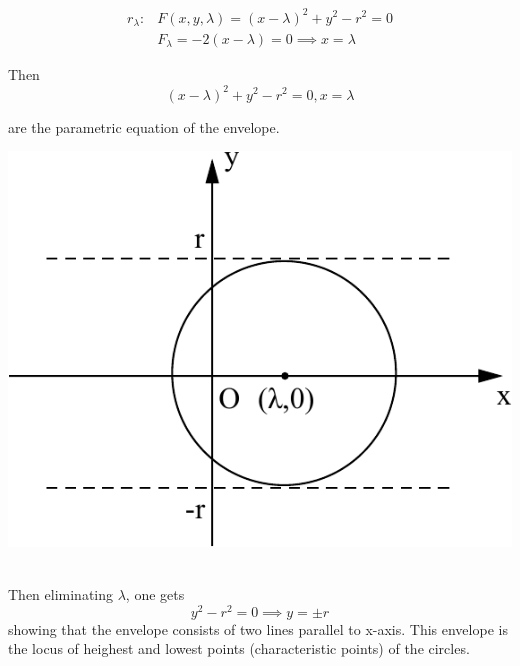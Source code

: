 \documentclass[11pt]{amsbook}
\begin{document}
\begin{hSolution}
	\begin{minipage}{0.6\textwidth}
		\begin{align*}
			r_\lambda : & F(x, y, \lambda) = (x - \lambda)^2 + y^2 - r^2 = 0    \\
			            & F_\lambda = -2 (x - \lambda) = 0 \implies x = \lambda
		\end{align*}

		Then
		\[
			(x - \lambda)^2 + y^2 - r^2 = 0, x = \lambda
		\]

		are the parametric equation of the envelope.
	\end{minipage}
	\begin{minipage}{0.4\textwidth}
		\includegraphics[width=1\textwidth, keepaspectratio]{images/b2p2-318-fig01}
	\end{minipage}\\

	Then eliminating $\lambda$, one gets
	\[
		y^2 - r^2 = 0 \implies y = \pm r
	\]
	showing that the envelope consists of two lines parallel to x-axis.
	This envelope is the locus of heighest and lowest points (characteristic points)
	of the circles.
\end{hSolution}
\end{document}
